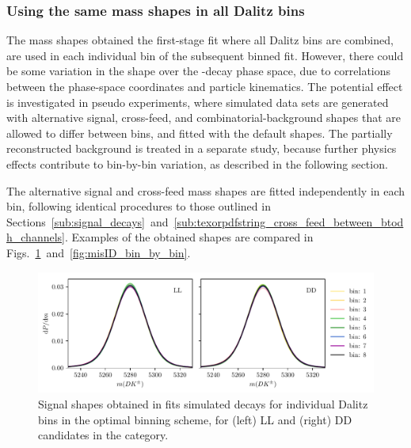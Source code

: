 
\subsubsection{Using the same mass shapes in all Dalitz bins} %
\label{ssub:using_the_same_signal_shape_in_all_dalitz_bins}

The mass shapes obtained the first-stage fit where all Dalitz bins are combined, are used in each individual bin of the subsequent binned fit. However, there could be some variation in the shape over the \D-decay phase space, due to correlations between the phase-space coordinates and particle kinematics. The potential effect is investigated in pseudo experiments, where simulated data sets are generated with alternative signal, cross-feed, and combinatorial-background shapes that are allowed to differ between bins, and fitted with the default shapes. The partially reconstructed background is treated in a separate study, because further physics effects contribute to bin-by-bin variation, as described in the following section. 

The alternative signal and cross-feed mass shapes are fitted independently in each bin, following identical procedures to those outlined in Sections~\ref{sub:signal_decays}~and~\ref{sub:texorpdfstring_cross_feed_between_btodh_channels}. Examples of the obtained shapes are compared in Figs.~\ref{fig:signal_bin_by_bin}~and~\ref{fig:misID_bin_by_bin}.

\begin{figure}[tp]
    \centering
    \includegraphics[width=0.85\columnwidth]{figures/analysis/systematics/signal_bin_by_bin.pdf}
    \caption{Signal shapes obtained in fits simulated \BtoDpi decays for individual Dalitz bins in the optimal binning scheme, for (left) LL and (right) DD candidates in the \BtoDpiDtoKspipi category. }
    \label{fig:signal_bin_by_bin}
\end{figure}

